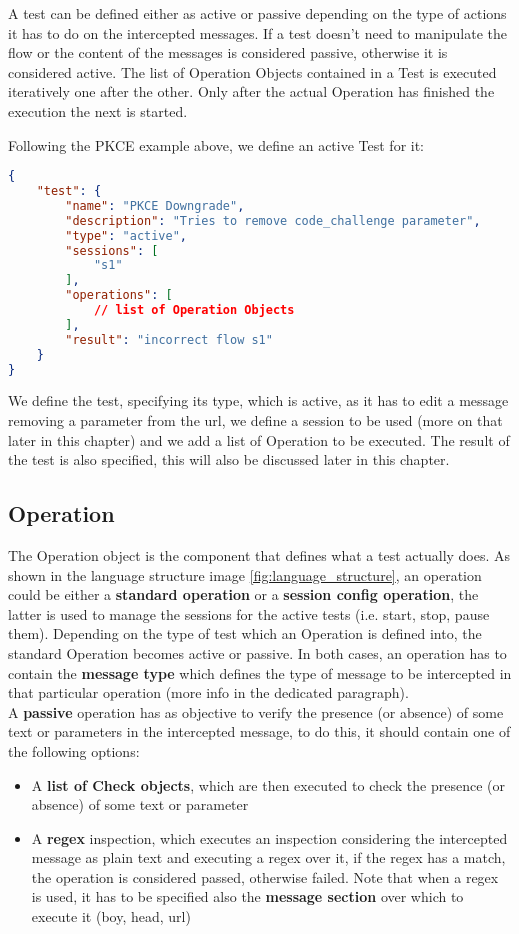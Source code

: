 A test can be defined either as active or passive depending on the type of actions it has to do on the intercepted messages. If a test doesn't need to manipulate the flow or the content of the messages is considered passive, otherwise it is considered active.
The list of Operation Objects contained in a Test is executed iteratively one after the other. Only after the actual Operation has finished the execution the next is started.

Following the PKCE example above, we define an active Test for it:

\begin{lstlisting}[language=json, caption=Active test definition]
{
    "test": {
        "name": "PKCE Downgrade",
        "description": "Tries to remove code_challenge parameter",
        "type": "active",
        "sessions": [
            "s1"
        ],
        "operations": [
            // list of Operation Objects
        ],
        "result": "incorrect flow s1"
    }
}    
\end{lstlisting}

We define the test, specifying its type, which is active, as it has to edit a message removing a parameter from the url, we define a session to be used (more on that later in this chapter) and we add a list of Operation to be executed. The result of the test is also specified, this will also be discussed later in this chapter.

\subsection{Operation}
The Operation object is the component that defines what a test actually does. As shown in the language structure image \ref{fig:language_structure}, an operation could be either a \textbf{standard operation} or a \textbf{session config operation}, the latter is used to manage the sessions for the active tests (i.e. start, stop, pause them). Depending on the type of test which an Operation is defined into, the standard Operation becomes active or passive.
In both cases, an operation has to contain the \textbf{message type} which defines the type of message to be intercepted in that particular operation (more info in the dedicated paragraph).
\\A \textbf{passive} operation has as objective to verify the presence (or absence) of some text or parameters in the intercepted message, to do this, it should contain one of the following options:
\begin{itemize}
    \item A \textbf{list of Check objects}, which are then executed to check the presence (or absence) of some text or parameter
    \item A \textbf{regex} inspection, which executes an inspection considering the intercepted message as plain text and executing a regex over it, if the regex has a match, the operation is considered passed, otherwise failed. Note that when a regex is used, it has to be specified also the \textbf{message section} over which to execute it (boy, head, url)
\end{itemize}

